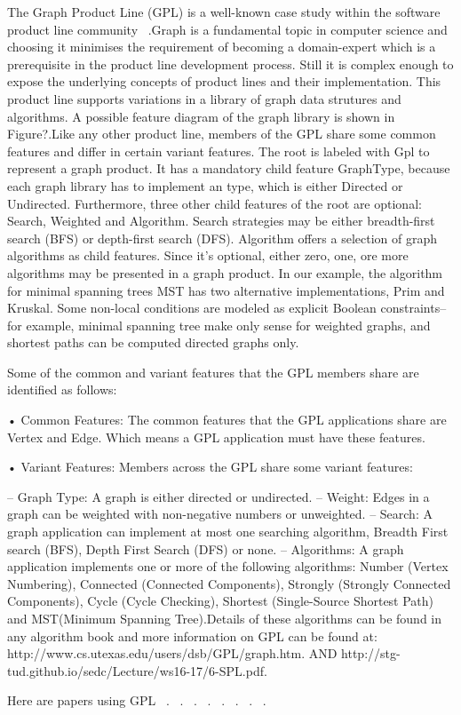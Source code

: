

The Graph Product Line (GPL) is a well-known case study within the software product line community
~\cite{Lopez-Herrejon:2001:SPE:645418.652082}.Graph is a fundamental topic in computer science and choosing it minimises the requirement
of becoming a domain-expert which is a prerequisite in the product line development process. Still it is complex
enough to expose the underlying concepts of product lines and their implementation. This product line
 supports variations in a library of graph data strutures and algorithms. A possible feature diagram of the graph
 library is shown in Figure?.Like any other product line, members of the GPL share some common features and differ in
 certain variant features. The root is labeled with Gpl to represent a graph product. It has a mandatory child feature
 GraphType, because each graph library has to implement an type, which is either Directed or Undirected. Furthermore,
 three other child features of the root are optional: Search, Weighted and Algorithm. Search strategies may be either
  breadth-first search (BFS) or depth-first search (DFS). Algorithm offers a selection of graph algorithms as child
  features. Since it's optional, either zero, one, ore more algorithms may be presented in a graph product. In our
  example, the algorithm for minimal spanning trees MST has two alternative implementations, Prim and Kruskal. Some
  non-local conditions are modeled as explicit Boolean constraints-- for example, minimal spanning tree make only
  sense for weighted graphs, and shortest paths can be computed directed graphs only.

  Some of the common and variant features that the GPL members share are identified as
  follows:

  • Common Features: The common features that the GPL applications share are Vertex and Edge.
  Which means a GPL application must have these features.

  • Variant Features: Members across the GPL share some variant features:

  – Graph Type: A graph is either directed or undirected.
  – Weight: Edges in a graph can be weighted with non-negative numbers or unweighted.
  – Search: A graph application can implement at most one searching algorithm, Breadth First
  search (BFS), Depth First Search (DFS) or none.
  – Algorithms: A graph application implements one or more of the following algorithms: Number
  (Vertex Numbering), Connected (Connected Components), Strongly (Strongly Connected
  Components), Cycle (Cycle Checking), Shortest (Single-Source Shortest Path) and MST(Minimum
  Spanning Tree).Details of these algorithms can be found in any algorithm book and more information
  on GPL can be found at: http://www.cs.utexas.edu/users/dsb/GPL/graph.htm.
  AND http://stg-tud.github.io/sedc/Lecture/ws16-17/6-SPL.pdf.

Here are papers using GPL ~\cite{Thum:2011:AFF:2061045.2062153}.
~\cite{ZhangGraphPL}.
~\cite{LopezHerrejon2014TowardsAB}.
~\cite{Bagheri:2010:CSP:1885639.1885642}.
~\cite{Lopez-Herrejon:2012:TFI:2110147.2110158}.
~\cite{Johansen2010ExploringTS}.
~\cite{doi:10.1002/smr.534}.
~\cite{10.1007/978-3-642-31095-9_40}.

